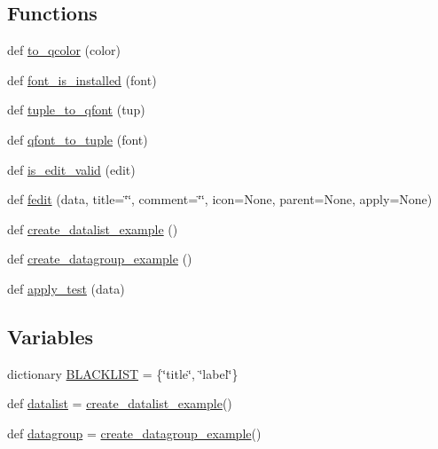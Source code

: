 \subsection*{Functions}
\begin{DoxyCompactItemize}
\item 
def \hyperlink{namespacematplotlib_1_1backends_1_1qt__editor_1_1__formlayout_a4d124204ce604ac84bdc2d43cd169ba4}{to\+\_\+qcolor} (color)
\item 
def \hyperlink{namespacematplotlib_1_1backends_1_1qt__editor_1_1__formlayout_a3c319853aeb7fd51557fee5f81443ec2}{font\+\_\+is\+\_\+installed} (font)
\item 
def \hyperlink{namespacematplotlib_1_1backends_1_1qt__editor_1_1__formlayout_a526d1bf30e919d2449642b29095fd395}{tuple\+\_\+to\+\_\+qfont} (tup)
\item 
def \hyperlink{namespacematplotlib_1_1backends_1_1qt__editor_1_1__formlayout_ad676d6161ff6d25bfccf198dc47179f3}{qfont\+\_\+to\+\_\+tuple} (font)
\item 
def \hyperlink{namespacematplotlib_1_1backends_1_1qt__editor_1_1__formlayout_a4801d9bd67321b1bab511a46a6a55c8c}{is\+\_\+edit\+\_\+valid} (edit)
\item 
def \hyperlink{namespacematplotlib_1_1backends_1_1qt__editor_1_1__formlayout_a4c5821a4b383e1a54ba3c2e16836e16c}{fedit} (data, title=\char`\"{}\char`\"{}, comment=\char`\"{}\char`\"{}, icon=None, parent=None, apply=None)
\item 
def \hyperlink{namespacematplotlib_1_1backends_1_1qt__editor_1_1__formlayout_a77b801002b7c8139b5e46d2612d9dde2}{create\+\_\+datalist\+\_\+example} ()
\item 
def \hyperlink{namespacematplotlib_1_1backends_1_1qt__editor_1_1__formlayout_a2a9c518d25b14420bdf64c4df6a5c143}{create\+\_\+datagroup\+\_\+example} ()
\item 
def \hyperlink{namespacematplotlib_1_1backends_1_1qt__editor_1_1__formlayout_a46ecf7c4b58fbb8f3348db15fbd3226c}{apply\+\_\+test} (data)
\end{DoxyCompactItemize}
\subsection*{Variables}
\begin{DoxyCompactItemize}
\item 
dictionary \hyperlink{namespacematplotlib_1_1backends_1_1qt__editor_1_1__formlayout_aaf01a4bbdc1504ba18c1bcdb6b974c8a}{B\+L\+A\+C\+K\+L\+I\+ST} = \{\char`\"{}title\char`\"{}, \char`\"{}label\char`\"{}\}
\item 
def \hyperlink{namespacematplotlib_1_1backends_1_1qt__editor_1_1__formlayout_aa6cc072f6786851cbe265173ecb84a93}{datalist} = \hyperlink{namespacematplotlib_1_1backends_1_1qt__editor_1_1__formlayout_a77b801002b7c8139b5e46d2612d9dde2}{create\+\_\+datalist\+\_\+example}()
\item 
def \hyperlink{namespacematplotlib_1_1backends_1_1qt__editor_1_1__formlayout_a90e3baa398afee8c7708ee8a0276b2cb}{datagroup} = \hyperlink{namespacematplotlib_1_1backends_1_1qt__editor_1_1__formlayout_a2a9c518d25b14420bdf64c4df6a5c143}{create\+\_\+datagroup\+\_\+example}()
\end{DoxyCompactItemize}


